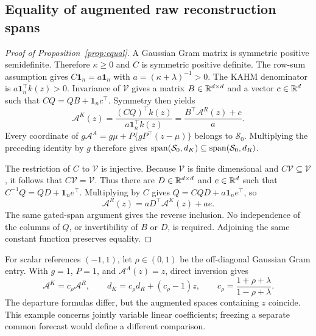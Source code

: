 \subsection{Equality of augmented raw reconstruction spans}
\begin{proof}[Proof of Proposition~\ref{prop:equal}]
A Gaussian Gram matrix is symmetric positive semidefinite. Therefore $\kappa\geq0$ and $C$ is symmetric positive definite. The row-sum assumption gives $C\mathbf1_n=a\mathbf1_n$ with $a=(\kappa+\lambda)^{-1}>0$. The KAHM denominator is $a\mathbf1_n^\top k(z)>0$. Invariance of $\mathcal V$ gives a matrix $B\in\mathbb R^{d\times d}$ and a vector $c\in\mathbb R^d$ such that $CQ=QB+\mathbf1_nc^\top$. Symmetry then yields
\[
 \mathcal A^K(z)=\frac{(CQ)^\top k(z)}{a\mathbf1_n^\top k(z)}
               =\frac{B^\top\mathcal A^R(z)+c}{a}.
\]
Every coordinate of $g\mathcal A^A=g\mu+P\{gP^\top(z-\mu)\}$ belongs to $\mathcal S_0$. Multiplying the preceding identity by $g$ therefore gives
$\operatorname{span}(\mathcal S_0,d_K)\subseteq\operatorname{span}(\mathcal S_0,d_R)$.

The restriction of $C$ to $\mathcal V$ is injective. Because $\mathcal V$ is finite dimensional and $C\mathcal V\subseteq\mathcal V$, it follows that $C\mathcal V=\mathcal V$. Thus there are $D\in\mathbb R^{d\times d}$ and $e\in\mathbb R^d$ such that $C^{-1}Q=QD+\mathbf1_ne^\top$. Multiplying by $C$ gives $Q=CQD+a\mathbf1_ne^\top$, so
\[
 \mathcal A^R(z)=aD^\top\mathcal A^K(z)+ae.
\]
The same gated-span argument gives the reverse inclusion. No independence of the columns of $Q$, or invertibility of $B$ or $D$, is required. Adjoining the same constant function preserves equality.
\end{proof}

For scalar references $(-1,1)$, let $\rho\in(0,1)$ be the off-diagonal Gaussian Gram entry. With $g=1$, $P=1$, and $\mathcal A^A(z)=z$, direct inversion gives
\[
 \mathcal A^K=c_\rho\mathcal A^R,\qquad
 d_K=c_\rho d_R+(c_\rho-1)z,\qquad
 c_\rho=\frac{1+\rho+\lambda}{1-\rho+\lambda}.
\]
The departure formulas differ, but the augmented spaces containing $z$ coincide. This example concerns jointly variable linear coefficients; freezing a separate common forecast would define a different comparison.

